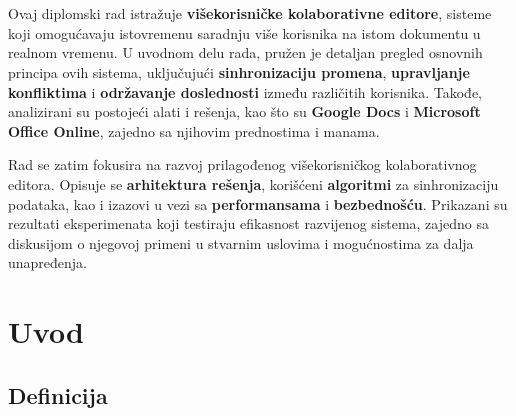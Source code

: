 \documentclass[12pt]{article}
\newcommand{\startnewsection}{
    \clearpage %
    \ifodd\value{page}\else %
        \hbox{} %
        \newpage %
    \fi
}
\begin{document}
\restoregeometry %

\newpage
   
\thispagestyle{empty} %
    
\newcommand{\specialsection}[1]{
	\section*{\centering{#1}} %
}
    
\vspace*{0.5in}
\specialsection{Apstrakt}
    
\vspace*{0.5in}

Ovaj diplomski rad istražuje \textbf{višekorisničke kolaborativne editore}, sisteme koji omogućavaju istovremenu saradnju više korisnika na istom dokumentu u realnom vremenu. U uvodnom delu rada, pružen je detaljan pregled osnovnih principa ovih sistema, uključujući \textbf{sinhronizaciju promena}, \textbf{upravljanje konfliktima} i \textbf{održavanje doslednosti} između različitih korisnika. Takođe, analizirani su postojeći alati i rešenja, kao što su \textbf{Google Docs} i \textbf{Microsoft Office Online}, zajedno sa njihovim prednostima i manama.
    
Rad se zatim fokusira na razvoj prilagođenog višekorisničkog kolaborativnog editora. Opisuje se \textbf{arhitektura rešenja}, korišćeni \textbf{algoritmi} za sinhronizaciju podataka, kao i izazovi u vezi sa \textbf{performansama} i \textbf{bezbednošću}. Prikazani su rezultati eksperimenata koji testiraju efikasnost razvijenog sistema, zajedno sa diskusijom o njegovoj primeni u stvarnim uslovima i mogućnostima za dalja unapređenja.

\newpage

\newpage
{}
\setcounter{page}{1}

\startnewsection

\section{Uvod}

\vspace{+0.5cm}
   
\subsection{Definicija}
\end{document}
